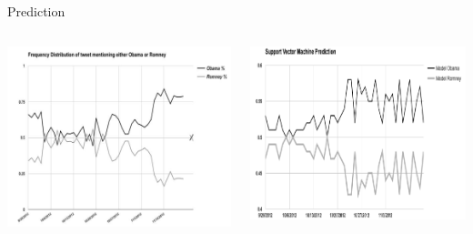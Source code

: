 \begin{frame}{Prediction}
	\begin{columns}
		
		\begin{column}{0.45\textwidth}
			\begin{tcolorbox}[colback=white, colframe=ElixirPurple, arc=3mm, boxrule=0mm, height=0.8\textheight, valign=center, title=Frequency]
				\includegraphics[width=\tcbtextwidth,   keepaspectratio]{pictures/TwitterElection2012/twitter_temp_distr.png}
			\end{tcolorbox}
		\end{column}
		
		\begin{column}{0.45\textwidth}
			\begin{tcolorbox}[colback=white, colframe=ElixirPurple, arc=3mm, boxrule=0mm, height=0.8\textheight, valign=center, title=Prediction]
				\includegraphics[width=\tcbtextwidth,   keepaspectratio]{pictures/TwitterElection2012/twitter_svm.png}
			\end{tcolorbox}
		\end{column}
		
	\end{columns}
\end{frame}


